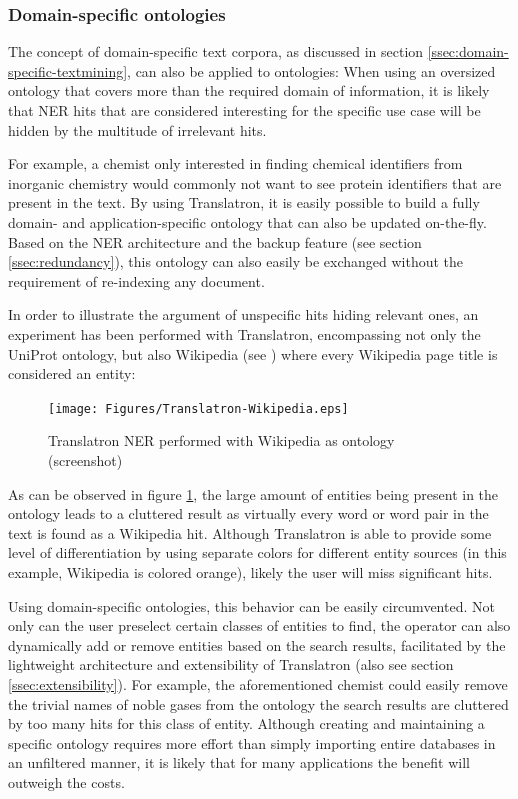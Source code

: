 \documentclass[a4paper, 12pt, twoside, reqn]{report}
\numberwithin{figure}{chapter}
\newtheorem[L]{boxedDefinition}{Definition}
\newtheorem[L]{boxedExample}{Example}
\begin{document}
\subsubsection{Domain-specific ontologies}\label{sssec:domain-specific-ontologies}

The concept of domain-specific text corpora, as discussed in section \ref{ssec:domain-specific-textmining}, can also be applied to ontologies: When using an oversized ontology that covers more than the required domain of information, it is likely that NER hits that are considered interesting for the specific use case will be hidden by the multitude of irrelevant hits.

For example, a chemist only interested in finding chemical identifiers from inorganic chemistry would commonly not want to see protein identifiers that are present in the text. By using Translatron, it is easily possible to build a fully domain- and application-specific ontology that can also be updated on-the-fly. Based on the NER architecture and the backup feature (see section \ref{ssec:redundancy}), this ontology can also easily be exchanged without the requirement of re-indexing any document.

In order to illustrate the argument of unspecific hits hiding relevant ones, an experiment has been performed with Translatron, encompassing not only the UniProt ontology, but also Wikipedia (see \cite{wikipedia}) where every Wikipedia page title is considered an entity:

\begin{figure}[!htb]
  \centering
  \texttt{[image: Figures/Translatron-Wikipedia.eps]}
  \caption[Translatron NER with Wikipedia ontology]{Translatron NER performed with Wikipedia as ontology (screenshot)}
  \label{fig:wikipedia-ontology}
\end{figure}

As can be observed in figure \ref{fig:wikipedia-ontology}, the large amount of entities being present in the ontology leads to a cluttered result as virtually every word or word pair in the text is found as a Wikipedia hit. Although Translatron is able to provide some level of differentiation by using separate colors for different entity sources (in this example, Wikipedia is colored orange), likely the user will miss significant hits.

Using domain-specific ontologies, this behavior can be easily circumvented. Not only can the user preselect certain classes of entities to find, the operator can also dynamically add or remove entities based on the search results, facilitated by the lightweight architecture and extensibility of Translatron (also see section \ref{ssec:extensibility}). For example, the aforementioned chemist could easily remove the trivial names of noble gases from the ontology the search results are cluttered by too many hits for this class of entity. Although creating and maintaining a specific ontology requires more effort than simply importing entire databases in an unfiltered manner, it is likely that for many applications the benefit will outweigh the costs.
\end{document}
